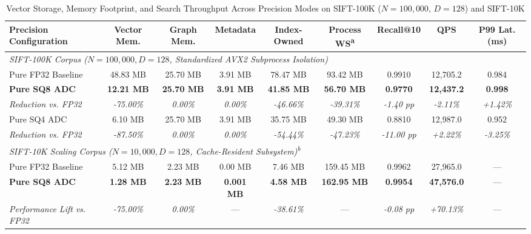 \begin{table}[t]
\centering
\caption{Vector Storage, Memory Footprint, and Search Throughput Across Precision Modes on SIFT-100K ($N=100{,}000$, $D=128$) and SIFT-10K}
\label{tab:quantization_memory}
\begin{tabular}{lcccccccc}
\toprule
\textbf{Precision Configuration} & \textbf{Vector Mem.} & \textbf{Graph Mem.} & \textbf{Metadata} & \textbf{Index-Owned} & \textbf{Process WS\textsuperscript{a}} & \textbf{Recall@10} & \textbf{QPS} & \textbf{P99 Lat. (ms)} \\
\midrule
\multicolumn{9}{l}{\textit{SIFT-100K Corpus ($N=100{,}000, D=128$, Standardized AVX2 Subprocess Isolation)}} \\
Pure FP32 Baseline & 48.83 MB & 25.70 MB & 3.91 MB & 78.47 MB & 93.42 MB & 0.9910 & 12{,}705.2 & 0.984 \\
\textbf{Pure SQ8 ADC} & \textbf{12.21 MB} & \textbf{25.70 MB} & \textbf{3.91 MB} & \textbf{41.85 MB} & \textbf{56.70 MB} & \textbf{0.9770} & \textbf{12{,}437.2} & \textbf{0.998} \\
\quad \textit{Reduction vs. FP32} & \textit{-75.00\%} & \textit{0.00\%} & \textit{0.00\%} & \textit{-46.66\%} & \textit{-39.31\%} & \textit{-1.40 pp} & \textit{-2.11\%} & \textit{+1.42\%} \\
Pure SQ4 ADC & 6.10 MB & 25.70 MB & 3.91 MB & 35.75 MB & 49.30 MB & 0.8810 & 12{,}987.0 & 0.952 \\
\quad \textit{Reduction vs. FP32} & \textit{-87.50\%} & \textit{0.00\%} & \textit{0.00\%} & \textit{-54.44\%} & \textit{-47.23\%} & \textit{-11.00 pp} & \textit{+2.22\%} & \textit{-3.25\%} \\
\midrule
\multicolumn{9}{l}{\textit{SIFT-10K Scaling Corpus ($N=10{,}000, D=128$, Cache-Resident Subsystem)\textsuperscript{b}}} \\
Pure FP32 Baseline & 5.12 MB & 2.23 MB & 0.00 MB & 7.46 MB & 159.45 MB & 0.9962 & 27{,}965.0 & --- \\
\textbf{Pure SQ8 ADC} & \textbf{1.28 MB} & \textbf{2.23 MB} & \textbf{0.001 MB} & \textbf{4.58 MB} & \textbf{162.95 MB} & \textbf{0.9954} & \textbf{47{,}576.0} & --- \\
\quad \textit{Performance Lift vs. FP32} & \textit{-75.00\%} & \textit{0.00\%} & --- & \textit{-38.61\%} & --- & \textit{-0.08 pp} & \textit{+70.13\%} & --- \\

\end{tabular}
\end{table}
